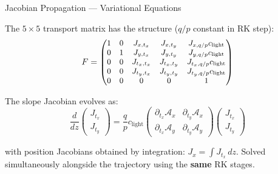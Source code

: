 \documentclass[aspectratio=169, 11pt]{beamer}
\newcommand{\qop}{q/p}
\newcommand{\clgt}{c_\text{light}}
\newcommand{\tx}{t_x}
\newcommand{\ty}{t_y}
\begin{document}
\begin{frame}{Jacobian Propagation --- Variational Equations}

The $5\times5$ transport matrix has the structure ($\qop$ constant in RK step):
\begin{equation*}
  F =
  {\small\begin{pmatrix}
    1 & 0 & J_{x,\tx}   & J_{x,\ty}   & J_{x,\qop}\clgt \\
    0 & 1 & J_{y,\tx}   & J_{y,\ty}   & J_{y,\qop}\clgt \\
    0 & 0 & J_{\tx,\tx} & J_{\tx,\ty} & J_{\tx,\qop}\clgt \\
    0 & 0 & J_{\ty,\tx} & J_{\ty,\ty} & J_{\ty,\qop}\clgt \\
    0 & 0 & 0            & 0            & 1
  \end{pmatrix}}
\end{equation*}

The slope Jacobian evolves as:
\begin{equation*}
  \frac{d}{dz}\!\begin{pmatrix} J_{\tx} \\ J_{\ty} \end{pmatrix}
  = \frac{q}{p}\clgt
  \begin{pmatrix}
    \partial_{\tx}\mathcal{A}_x & \partial_{\ty}\mathcal{A}_x \\
    \partial_{\tx}\mathcal{A}_y & \partial_{\ty}\mathcal{A}_y
  \end{pmatrix}
  \!\begin{pmatrix} J_{\tx} \\ J_{\ty} \end{pmatrix}
\end{equation*}

with position Jacobians obtained by integration: $J_x = \int J_{\tx}\,dz$.
Solved simultaneously alongside the trajectory using the \textbf{same} RK
stages.
\end{frame}
\end{document}
